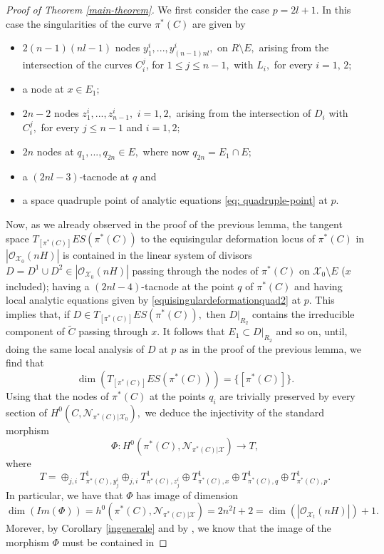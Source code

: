 \documentclass[plain]{amsart}
\def\N{\mathcal N}
\begin{document}
\begin{proof}[Proof of Theorem \ref{main-theorem}]
We first consider the case $p=2l+1.$ In this case  the singularities of the curve $\pi^*(C)$ are given by
\begin{itemize}
\item $2(n-1)(nl-1)$ nodes $y_1^i,...,y^i_{(n-1)nl},$ on $R\setminus E,$ arising from the intersection of the 
curves $C_{i}^{j}$, for $1 \leq j \leq n-1,$ with $L_i,$ for every $i=1,\,2;$
\item a node at $x\in E_1;$
\item $2n-2$ nodes $z_1^i,...,z_{n-1}^i,$ $i=1,2,$ arising from the intersection of $D_i$ with $C_i^j,$ for every $j\leq n-1$ and $i=1,2;$
\item $2n$  nodes at $q_1,...,q_{2n}\in E,$ where now $q_{2n}=E_1\cap E;$ 
\item a $(2nl-3)$-tacnode at $q$ and
\item a space quadruple point of analytic equations \eqref{eq: quadruple-point} at $p.$
\end{itemize}
Now, as we already observed in the proof of the previous lemma,  the tangent space
$T_{[\pi^*(C)]}ES(\pi^*(C))$ to the equisingular deformation locus  of $\pi^*(C)$ in $|\mathcal O_{\mathcal X_0}(nH)|$
is contained in the linear system of divisors $D=D^1\cup D^2\in|\mathcal O_{\mathcal X_0}(nH)|$ passing through 
the nodes of $\pi^*(C)$ on $\mathcal X_0\setminus E$ ($x$ included); having a $(2nl-4)$-tacnode at the point $q$ of $\pi^*(C)$
and having local analytic equations given by \eqref{equisingulardeformationquad2} at $p$.
This implies that, if $D\in T_{[\pi^*(C)]}ES(\pi^*(C)),$ then $D|_{R_2}$ contains the irreducible component of
$\tilde C$ passing through $x.$ It follows that $E_1\subset D|_{R_2}$ and so on, until, doing the same
local analysis of $D$ at $p$ as in the proof of the previous lemma, we find that
$$\dim(T_{[\pi^*(C)]}ES(\pi^*(C)))
=\{[\pi^*(C)]\}.$$
Using that the nodes of $\pi^*(C)$ at the points $q_i$ are trivially
preserved by every section of $H^0(C,\N_{\pi^*(C)|\mathcal X_0}),$ we deduce the injectivity  
of the standard morphism
$$\Phi:H^0(\pi^*(C),\N_{\pi^*(C)|\mathcal X})\to T,$$ where
$$T= \oplus_{j,i}T^1_{\pi^*(C),y_j^i}\oplus_{j,i}T^1_{\pi^*(C),z_j^i} \oplus T^1_{\pi^*(C),x}\oplus T^1_{\pi^*(C),q}\oplus T^1_{\pi^*(C),p}.$$
In particular, we have that $\Phi$ has image of dimension 
$$
\dim(Im(\Phi))=h^0(\pi^*(C),\N_{\pi^*(C)|\mathcal X})=2n^2l+2=\dim(|\mathcal O_{\mathcal X_t}(nH)|)+1.$$ 
Morever, by Corollary \ref{ingenerale} and by  \cite[Corollary 3.6]{galati-knutsen},
we know that  the image of 
the morphism $\Phi$ must be contained in 

\end{proof}
\end{document}
